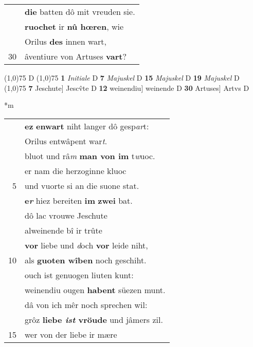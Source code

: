 \documentclass[8pt,a4paper,notitlepage]{article}
\begin{document}
\begin{table}[ht]
\begin{minipage}[t]{0.5\linewidth}
\begin{tabular}{rl}
 & \textbf{die} batten dô mit vreuden sie.\\ 
 & \textbf{ruochet} ir \textbf{nû hœren}, wie\\ 
 & Orilus \textbf{des} innen wart,\\ 
30 & âventiure von Artuses \textbf{vart}?\\ 
\end{tabular}
\scriptsize
\line(1,0){75} \newline
D \newline
\line(1,0){75} \newline
\textbf{1} \textit{Initiale} D  \textbf{7} \textit{Majuskel} D  \textbf{15} \textit{Majuskel} D  \textbf{19} \textit{Majuskel} D  \newline
\line(1,0){75} \newline
\textbf{7} Jeschute] Jescv̂te D \textbf{12} weinendiu] weinende D \textbf{30} Artuses] Artvs D \newline
\end{minipage}
\hspace{0.5cm}
\begin{minipage}[t]{0.5\linewidth}
\small
\begin{center}*m
\end{center}
\begin{tabular}{rl}
 & \textbf{ez} \textbf{en}\textbf{wart} niht langer dô gesp\textit{ar}t:\\ 
 & Orilus entwâpent war\textit{t}.\\ 
 & bluot und râ\textit{m} \textbf{man von im} t\textit{w}uoc.\\ 
 & er nam die herzoginne kluoc\\ 
5 & und vuorte si an die suone stat.\\ 
 & \textbf{e\textit{r}} hiez bereiten \textbf{im} \textbf{zwei} bat.\\ 
 & dô lac vrouwe Jeschute\\ 
 & alweinende bî ir trûte\\ 
 & \textbf{vor} liebe und \textit{d}och \textbf{vor} leide niht,\\ 
10 & als \textbf{guoten wîben} noch geschiht.\\ 
 & ouch ist genuogen liuten kunt:\\ 
 & weinendiu ougen \textbf{habent} süezen munt.\\ 
 & dâ von ich mêr noch sprechen wil:\\ 
 & grôz \textbf{liebe \textit{ist} vröude} und jâmers zil.\\ 
15 & wer von der liebe ir mære\\ 

\end{tabular}
\end{minipage}
\end{table}
\end{document}

